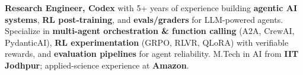 \documentclass[letter,10pt]{article}
\begin{document}

\textbf{Research Engineer, Codex} with 5+ years of experience building \textbf{agentic AI systems}, \textbf{RL post-training}, and \textbf{evals/graders} for LLM-powered agents.
Specialize in \textbf{multi-agent orchestration \& function calling} (A2A, CrewAI, PydanticAI), \textbf{RL experimentation} (GRPO, RLVR, QLoRA) with verifiable rewards, and \textbf{evaluation pipelines} for agent reliability.
M.Tech in AI from \textbf{IIT Jodhpur}; applied-science experience at \textbf{Amazon}.
\end{document}

